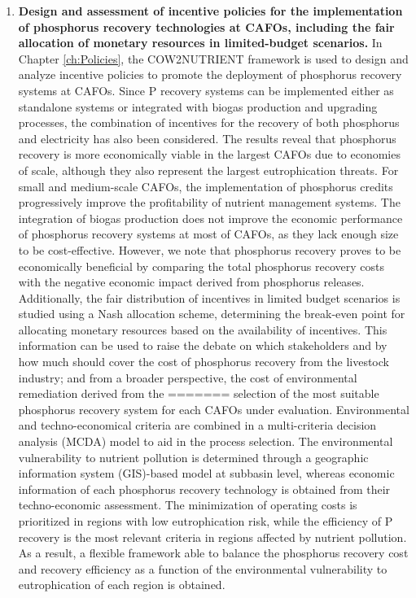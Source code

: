 \begin{enumerate}[font=\bfseries]
	\item \textbf{Design and assessment of incentive policies for the implementation of phosphorus recovery technologies at CAFOs, including the fair allocation of monetary resources in limited-budget scenarios.} In Chapter \ref{ch:Policies}, the COW2NUTRIENT framework is used to design and analyze incentive policies to promote the deployment of phosphorus recovery systems at CAFOs. Since P recovery systems can be implemented either as standalone systems or integrated with biogas production and upgrading processes, the combination of incentives for the recovery	of both phosphorus and electricity has also been considered. The results reveal that phosphorus recovery is more economically viable in the largest CAFOs due to economies of scale, although they also represent the largest eutrophication threats. For small and medium-scale CAFOs, the implementation of phosphorus credits progressively improve the	profitability of nutrient management systems. The integration of biogas production does not improve the economic performance of phosphorus recovery systems at most of CAFOs, as they lack enough size to be cost-effective. However, we note that phosphorus recovery proves to be economically beneficial by comparing the total phosphorus recovery costs with the negative economic impact derived from phosphorus releases. Additionally, the fair distribution of incentives in limited budget scenarios is studied using a Nash allocation scheme, determining the break-even point for allocating monetary resources based on the availability of incentives. This information can be used to raise the debate on which stakeholders and by how much should cover the cost of phosphorus recovery from the livestock industry; and from a broader perspective, the cost of environmental remediation derived from the
=======
	selection of the most suitable phosphorus recovery system for each CAFOs under evaluation. Environmental and techno-economical criteria are combined in a multi-criteria decision analysis
	(MCDA) model to aid in the process selection. The environmental vulnerability to nutrient pollution is determined through a geographic information system (GIS)-based model at subbasin level, whereas economic information of each phosphorus recovery technology is obtained from their techno-economic assessment. The minimization of operating costs is 	prioritized in regions with low eutrophication risk, while the efficiency of P recovery is the most relevant criteria in regions affected by nutrient pollution. As a result, a flexible framework able to balance the phosphorus recovery cost and recovery efficiency as a function of the environmental vulnerability to
	eutrophication of each region is obtained. 	
	

\end{enumerate}
